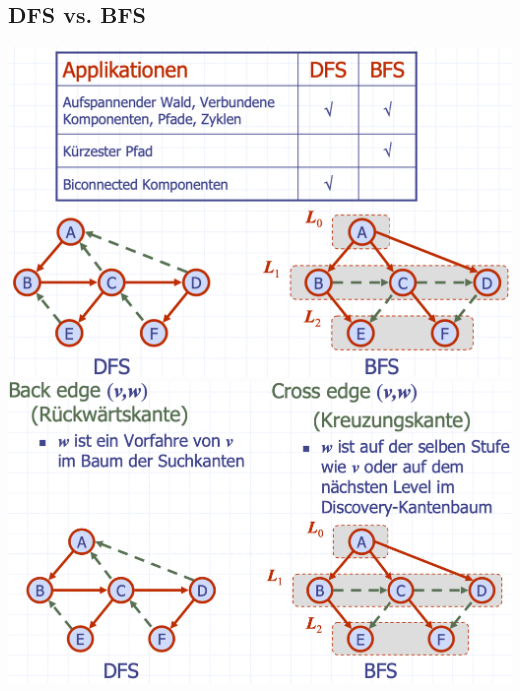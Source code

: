 \subsection{DFS vs. BFS}
\begin{center}
    \includegraphics[scale=.25]{graphic/13 BFS/DFS vs. BFS1.png}
    \includegraphics[scale=.25]{graphic/13 BFS/DFS vs. BFS2.png}
\end{center}
\vspace{-8pt}

\vfill
$ $
\columnbreak
